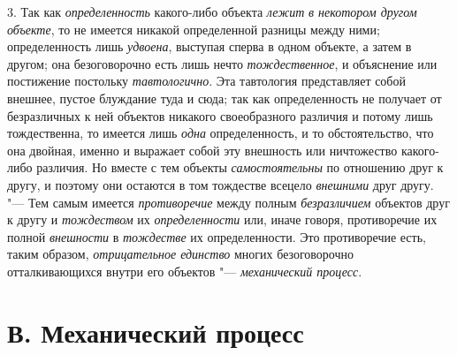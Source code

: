 3. Так как {\em определенность} какого-либо объекта {\em лежит}
{\em в некотором другом объекте},
то не имеется никакой определенной разницы между ними;
определенность лишь {\em удвоена},
выступая сперва в одном объекте, а затем в другом; она
безоговорочно есть лишь нечто {\em тождественное}, и
объяснение или постижение постольку {\em тавтологично}. Эта
тавтология представляет собой внешнее, пустое блуждание туда и сюда; так
как определенность не получает от безразличных к ней объектов никакого
своеобразного различия и потому лишь тождественна, то имеется лишь {\em одна}
определенность, и то обстоятельство, что она двойная, именно
и выражает собой эту внешность или ничтожество какого-либо различия. Но
вместе с тем объекты {\em самостоятельны} по
отношению друг к другу, и поэтому они остаются в том тождестве всецело
{\em внешними} друг другу. "--- Тем самым имеется {\em противоречие} между
полным {\em безразличием} объектов друг к другу и {\em тождеством} их
{\em определенности} или, иначе говоря, противоречие их полной
{\em внешности} в {\em тождестве} их определенности. Это противоречие есть,
таким образом, {\em отрицательное единство} многих безоговорочно
отталкивающихся внутри его объектов "--- {\em механический процесс}.

\section[В. Механический процесс]{В. Механический процесс}

